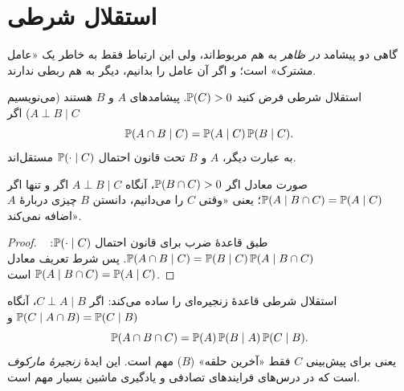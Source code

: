 \section{استقلال شرطی}
\label{sec:cond-indep}

گاهی دو پیشامد \emph{در ظاهر} به هم مربوط‌اند، ولی این ارتباط فقط به خاطر یک «عامل مشترک» است؛ و اگر آن عامل را بدانیم، دیگر به هم ربطی ندارند.

\begin{definition}[label=def:cond-indep]{استقلال شرطی}
فرض کنید $\P(C)>0$. پیشامدهای $A$ و $B$  هستند (می‌نویسیم $A\perp B\mid C$) اگر
\[ \P(A\cap B\mid C)=\P(A\mid C)\,\P(B\mid C). \]
به عبارت دیگر، $A$ و $B$ تحت قانون احتمال $\P(\cdot\mid C)$ مستقل‌اند.
\end{definition}

\begin{proposition}{صورت معادل}
اگر $\P(B\cap C)>0$، آنگاه $A\perp B\mid C$ اگر و تنها اگر $\P(A\mid B\cap C)=\P(A\mid C)$؛ یعنی «وقتی $C$ را می‌دانیم، دانستن $B$ چیزی دربارهٔ $A$ اضافه نمی‌کند».
\end{proposition}

\begin{proof}
طبق قاعدهٔ ضرب برای قانون احتمال $\P(\cdot\mid C)$: \ $\P(A\cap B\mid C)=\P(B\mid C)\,\P(A\mid B\cap C)$. پس شرط تعریف معادل $\P(A\mid B\cap C)=\P(A\mid C)$ است.
\end{proof}

\begin{note}
استقلال شرطی قاعدهٔ زنجیره‌ای را ساده می‌کند: اگر $C\perp A\mid B$، آنگاه $\P(C\mid A\cap B)=\P(C\mid B)$ و
\[ \P(A\cap B\cap C)=\P(A)\,\P(B\mid A)\,\P(C\mid B). \]
یعنی برای پیش‌بینی $C$ فقط «آخرین حلقه» ($B$) مهم است. این ایدهٔ \emph{زنجیرهٔ مارکوف} است که در درس‌های فرایندهای تصادفی و یادگیری ماشین بسیار مهم است.
\end{note}

